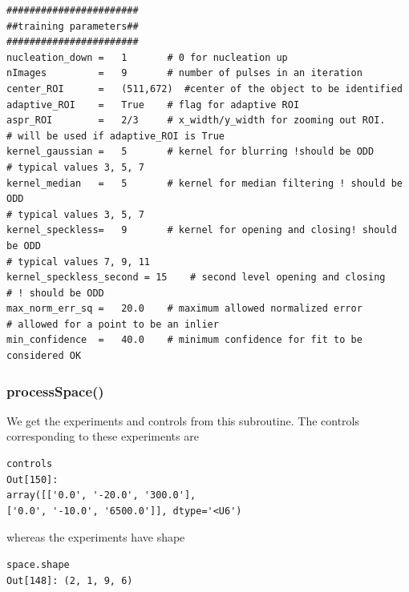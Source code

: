 \documentclass[12pt, twoside, a4paper]{article}
\begin{document}
\begin{verbatim}
#######################
##training parameters##
#######################
nucleation_down =   1       # 0 for nucleation up
nImages         =   9       # number of pulses in an iteration
center_ROI      =   (511,672)  #center of the object to be identified
adaptive_ROI    =   True    # flag for adaptive ROI
aspr_ROI        =   2/3     # x_width/y_width for zooming out ROI.
# will be used if adaptive_ROI is True
kernel_gaussian =   5       # kernel for blurring !should be ODD
# typical values 3, 5, 7
kernel_median   =   5       # kernel for median filtering ! should be ODD
# typical values 3, 5, 7
kernel_speckless=   9       # kernel for opening and closing! should be ODD
# typical values 7, 9, 11
kernel_speckless_second = 15    # second level opening and closing
# ! should be ODD
max_norm_err_sq =   20.0    # maximum allowed normalized error
# allowed for a point to be an inlier
min_confidence  =   40.0    # minimum confidence for fit to be considered OK
\end{verbatim}
%


\subsubsection{processSpace()}
We get the experiments and controls from this subroutine. The controls corresponding to these experiments are 
\begin{verbatim}
controls
Out[150]: 
array([['0.0', '-20.0', '300.0'],
['0.0', '-10.0', '6500.0']], dtype='<U6')
\end{verbatim}

whereas the experiments have shape
\begin{verbatim}
space.shape
Out[148]: (2, 1, 9, 6)
\end{verbatim}
\end{document}
